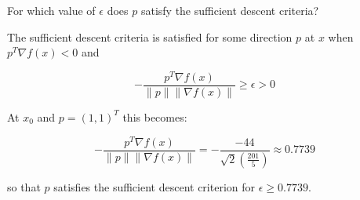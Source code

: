 For which value of $\epsilon$ does $p$ satisfy the sufficient descent criteria?

\begin{solution}
    The sufficient descent criteria is satisfied for some direction $p$ at $x$ when $p^T \nabla f(x) < 0$ and

    $$
    -\frac{p^T \nabla f(x)}{\lVert p \rVert \lVert \nabla f(x) \rVert} \ge \epsilon > 0
    $$

    At $x_0$ and $p = (1, 1)^T$ this becomes:

    $$
    -\frac{p^T \nabla f(x)}{\lVert p \rVert \lVert \nabla f(x) \rVert} = -\frac{-44}{\sqrt{2} \left(\frac{201}{5}\right)} \approx 0.7739
    $$

    so that $p$ satisfies the sufficient descent criterion for $\epsilon \ge 0.7739$.
    \ \\
\end{solution}